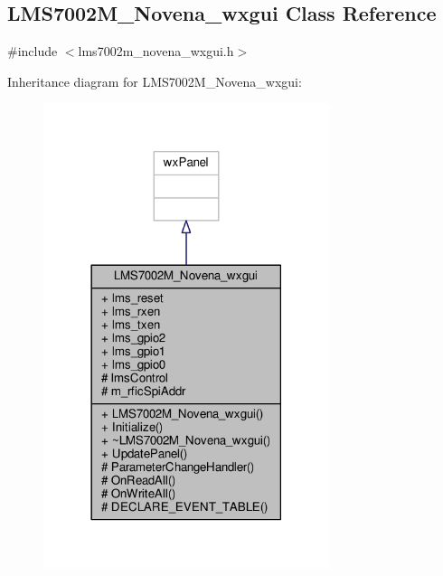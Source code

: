 \subsection{L\+M\+S7002\+M\+\_\+\+Novena\+\_\+wxgui Class Reference}
\label{classLMS7002M__Novena__wxgui}


{\ttfamily \#include $<$lms7002m\+\_\+novena\+\_\+wxgui.\+h$>$}



Inheritance diagram for L\+M\+S7002\+M\+\_\+\+Novena\+\_\+wxgui\+:
\nopagebreak
\begin{figure}[H]
\begin{center}
\leavevmode
\includegraphics[width=237pt]{d0/dad/classLMS7002M__Novena__wxgui__inherit__graph}
\end{center}
\end{figure}


